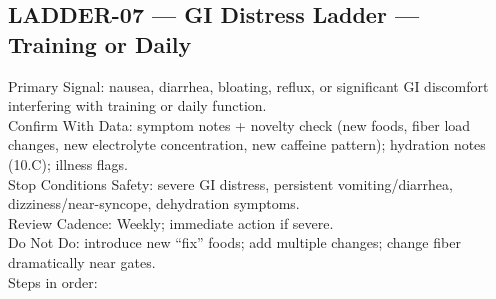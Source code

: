 \documentclass[10pt]{article}
\begin{document}
\newpage

\subsection*{LADDER-07 — GI Distress Ladder — Training or Daily}
{}

Primary Signal: nausea, diarrhea, bloating, reflux, or significant GI discomfort interfering with training or daily function.\\
Confirm With Data: symptom notes + novelty check (new foods, fiber load changes, new electrolyte concentration, new caffeine pattern); hydration notes (10.C); illness flags.\\
Stop Conditions Safety: severe GI distress, persistent vomiting/diarrhea, dizziness/near-syncope, dehydration symptoms.\\
Review Cadence: Weekly; immediate action if severe.\\
Do Not Do: introduce new “fix” foods; add multiple changes; change fiber dramatically near gates.\\
Steps in order:
\end{document}
